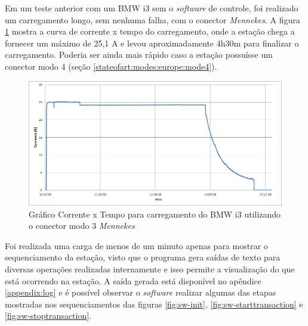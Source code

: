     Em um teste anterior com um BMW i3 sem o \textit{software} de controle, foi realizado um carregamento longo, sem nenhuma falha, com o conector \textit{Mennekes}. A figura \ref{fig:evse-charge} mostra a curva de corrente x tempo do carregamento, onde a estação chega a fornecer um máximo de 25,1 A e levou aproximadamente 4h30m para finalizar o carregamento. Poderia ser ainda mais rápido caso a estação possuísse um conector modo 4 (seção \ref{stateofart:modes:europe:mode4}).

    \begin{figure}[H]
      \begin{center}
        \includegraphics[width=\textwidth,natwidth=1420,natheight=2130]{assets/images/evse-charge.png}
        \caption{Gráfico Corrente x Tempo para carregamento do BMW i3 utilizando o conector modo 3 \textit{Mennekes}}
        \label{fig:evse-charge}
      \end{center}
    \end{figure}

    Foi realizada uma carga de menos de um minuto apenas para mostrar o sequenciamento da estação, visto que o programa gera saídas de texto para diversas operações realizadas internamente e isso permite a visualização do que está ocorrendo na estação. A saída gerada está disponível no apêndice \ref{appendix:log} e é possível observar o \textit{software} realizar algumas das etapas mostradas nos sequenciamentos das figuras \ref{fig:sw-init}, \ref{fig:sw-starttransaction} e \ref{fig:sw-stoptransaction}.

